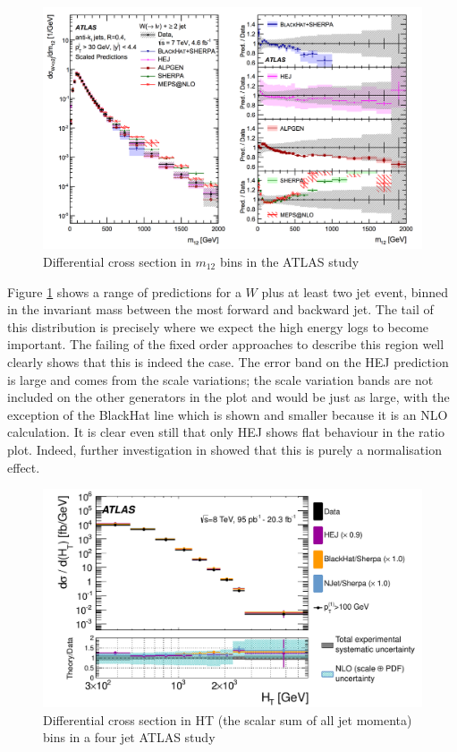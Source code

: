 \begin{figure}[t]
\centering
\includegraphics[scale=0.4]{Images/wjets_HEJ.png} 
\caption{Differential cross section in $m_{12}$ bins in the ATLAS study \cite{Aad2014a}}
\label{fig:wjet}
\end{figure} 

Figure \ref{fig:wjet} shows a range of predictions for a $W$ plus at least two jet event, binned in the invariant mass between the most forward and backward jet. The tail of this distribution is precisely where we expect the high energy logs to become important. The failing of the fixed order approaches to describe this region well clearly shows that this is indeed the case. The error band on the HEJ prediction is large and comes from the scale variations; the scale variation bands are not included on the other generators in the plot and would be just as large, with the exception of the BlackHat line which is shown and smaller because it is an NLO calculation. It is clear even still that only HEJ shows flat behaviour in the ratio plot. Indeed, further investigation in \cite{Andersen2016} showed that this is purely a normalisation effect. 

\begin{figure}[t]
\centering
\includegraphics[scale=0.8]{Images/4jet_hej.pdf} 
\caption{Differential cross section in HT (the scalar sum of all jet momenta) bins in a four jet ATLAS study \cite{Aad2015}}
\label{fig:4jetan}
\end{figure}

